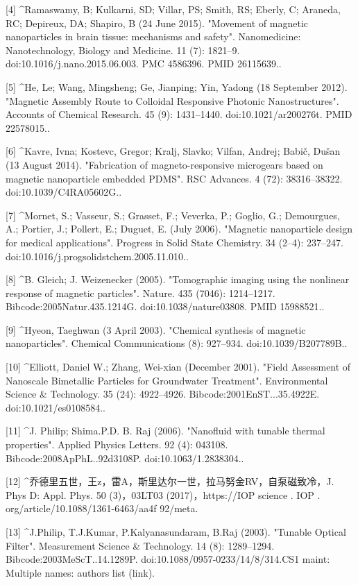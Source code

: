 [4]
^Ramaswamy, B; Kulkarni, SD; Villar, PS; Smith, RS; Eberly, C; Araneda, RC; Depireux, DA; Shapiro, B (24 June 2015). "Movement of magnetic nanoparticles in brain tissue: mechanisms and safety". Nanomedicine: Nanotechnology, Biology and Medicine. 11 (7): 1821–9. doi:10.1016/j.nano.2015.06.003. PMC 4586396. PMID 26115639..

[5]
^He, Le; Wang, Mingsheng; Ge, Jianping; Yin, Yadong (18 September 2012). "Magnetic Assembly Route to Colloidal Responsive Photonic Nanostructures". Accounts of Chemical Research. 45 (9): 1431–1440. doi:10.1021/ar200276t. PMID 22578015..

[6]
^Kavre, Ivna; Kostevc, Gregor; Kralj, Slavko; Vilfan, Andrej; Babič, Dušan (13 August 2014). "Fabrication of magneto-responsive microgears based on magnetic nanoparticle embedded PDMS". RSC Advances. 4 (72): 38316–38322. doi:10.1039/C4RA05602G..

[7]
^Mornet, S.; Vasseur, S.; Grasset, F.; Veverka, P.; Goglio, G.; Demourgues, A.; Portier, J.; Pollert, E.; Duguet, E. (July 2006). "Magnetic nanoparticle design for medical applications". Progress in Solid State Chemistry. 34 (2–4): 237–247. doi:10.1016/j.progsolidstchem.2005.11.010..

[8]
^B. Gleich; J. Weizenecker (2005). "Tomographic imaging using the nonlinear response of magnetic particles". Nature. 435 (7046): 1214–1217. Bibcode:2005Natur.435.1214G. doi:10.1038/nature03808. PMID 15988521..

[9]
^Hyeon, Taeghwan (3 April 2003). "Chemical synthesis of magnetic nanoparticles". Chemical Communications (8): 927–934. doi:10.1039/B207789B..

[10]
^Elliott, Daniel W.; Zhang, Wei-xian (December 2001). "Field Assessment of Nanoscale Bimetallic Particles for Groundwater Treatment". Environmental Science & Technology. 35 (24): 4922–4926. Bibcode:2001EnST...35.4922E. doi:10.1021/es0108584..

[11]
^J. Philip; Shima.P.D. B. Raj (2006). "Nanofluid with tunable thermal properties". Applied Physics Letters. 92 (4): 043108. Bibcode:2008ApPhL..92d3108P. doi:10.1063/1.2838304..

[12]
^乔德里五世，王z，雷A，斯里达尔一世，拉马努金RV，自泵磁致冷，J. Phys D: Appl. Phys. 50 (3)，03LT03 (2017)，https://IOP science . IOP . org/article/10.1088/1361-6463/aa4f 92/meta.

[13]
^J.Philip, T.J.Kumar, P.Kalyanasundaram, B.Raj (2003). "Tunable Optical Filter". Measurement Science & Technology. 14 (8): 1289–1294. Bibcode:2003MeScT..14.1289P. doi:10.1088/0957-0233/14/8/314.CS1 maint: Multiple names: authors list (link).

